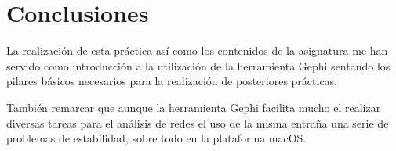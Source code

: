 \chapter{Conclusiones}

La realización de esta práctica así como los contenidos de la asignatura me han servido como introducción a la utilización de la herramienta Gephi sentando los pilares básicos necesarios para la realización de posteriores prácticas.

\bigskip
También remarcar que aunque la herramienta Gephi facilita mucho el realizar diversas tareas para el análisis de redes el uso de la misma entraña una serie de problemas de estabilidad, sobre todo en la plataforma macOS.
